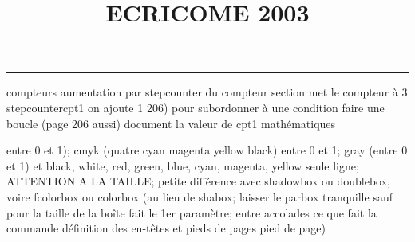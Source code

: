 \documentclass[11pt]{article}%
\title{\bf \vspace{-2cm} ECRICOME 2003} %
\author{} %
\date{} %
\renewcommand{\headrulewidth}{0pt}%
\renewcommand{\footrulewidth}{0.4pt}%
\begin{document}
\maketitle %
\vspace{-1.4cm}\hrule %
\thispagestyle{fancy}

\vspace*{.2cm}



compteurs%
aumentation par stepcounter du compteur section%
met le compteur à 3%
stepcounter{cpt1} on ajoute 1%
206) pour subordonner à une condition %
faire une boucle (page 206 aussi) %
document la valeur de cpt1 
mathématiques\newcommand{\ch}{\operatorname{ch}} 
\newcommand{\sh}{\operatorname{sh}}
\renewcommand{\tanh}{\operatorname{th}}
\renewcommand{\sinh}{\operatorname{sh}}
\renewcommand{\cosh}{\operatorname{ch}}
\newcommand{\argsh}{\operatorname{argsh}}
\newcommand{\argch}{\operatorname{argch}}
\newcommand{\argth}{\operatorname{argth}}
\newcommand{\Id}{\operatorname{Id}}
\renewcommand{\leq}{\leq}
\renewcommand{\geq}{\geq }

entre 0 et 1); cmyk (quatre cyan magenta yellow black) entre 0 et 1;
gray (entre 0 et 1) et black, white, red, green, blue, cyan, magenta,
yellow%
seule ligne; ATTENTION A LA TAILLE; petite différence avec shadowbox ou
doublebox, voire fcolorbox ou colorbox (au lieu de shabox; laisser le
parbox tranquille sauf pour la taille de la boîte
\newcommand{\Tbox}[1]{\begin{center} \shabox{\parbox{0.6
\linewidth}{#1}} \end{center}} %
fait le 1er paramètre; entre accolades ce que fait la commande
définition des en-têtes et pieds de pages\pagestyle{fancy}
\chead{}
\rfoot[ \ \thepage]{\thepage}
\cfoot{}
\lfoot{}
\thispagestyle{fancy} %
pied de page)\renewcommand{\footrulewidth}{0.4pt}
\renewcommand{\headrulewidth}{0.4pt}
\end{document}

